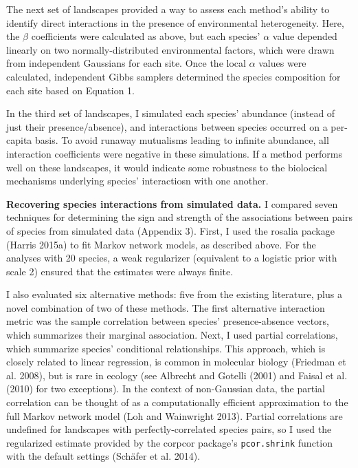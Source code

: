 \documentclass[12pt,]{article}
\begin{document}
\begin{spacing}{1.9}
\begin{flushleft}
The next set of landscapes provided a way to assess each method's
ability to identify direct interactions in the presence of environmental
heterogeneity. Here, the \(\beta\) coefficients were calculated as
above, but each species' \(\alpha\) value depended linearly on two
normally-distributed environmental factors, which were drawn from
independent Gaussians for each site. Once the local \(\alpha\) values
were calculated, independent Gibbs samplers determined the species
composition for each site based on Equation 1.

In the third set of landscapes, I simulated each species' abundance
(instead of just their presence/absence), and interactions between
species occurred on a per-capita basis. To avoid runaway mutualisms
leading to infinite abundance, all interaction coefficients were
negative in these simulations. If a method performs well on these
landscapes, it would indicate some robustness to the biolocical
mechanisms underlying species' interactiosn with one another.

\noindent \textbf{Recovering species interactions from simulated data.}
I compared seven techniques for determining the sign and strength of the
associations between pairs of species from simulated data (Appendix 3).
First, I used the rosalia package (Harris 2015a) to fit Markov network
models, as described above. For the analyses with 20 species, a weak
regularizer (equivalent to a logistic prior with scale 2) ensured that
the estimates were always finite.

I also evaluated six alternative methods: five from the existing
literature, plus a novel combination of two of these methods. The first
alternative interaction metric was the sample correlation between
species' presence-absence vectors, which summarizes their marginal
association. Next, I used partial correlations, which summarize species'
conditional relationships. This approach, which is closely related to
linear regression, is common in molecular biology (Friedman et al.
2008), but is rare in ecology (see Albrecht and Gotelli (2001) and
Faisal et al. (2010) for two exceptions). In the context of non-Gaussian
data, the partial correlation can be thought of as a computationally
efficient approximation to the full Markov network model (Loh and
Wainwright 2013). Partial correlations are undefined for landscapes with
perfectly-correlated species pairs, so I used the regularized estimate
provided by the corpcor package's \texttt{pcor.shrink} function with the
default settings (Schäfer et al. 2014).


\end{flushleft}
\end{spacing}
\end{document}
